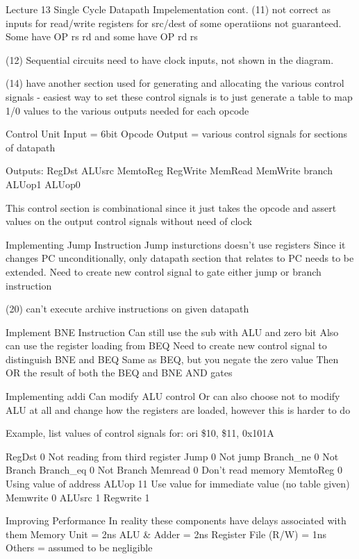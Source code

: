 \documentclass{article}
\begin{document}
Lecture 13
	Single Cycle Datapath Impelementation cont.
		(11) not correct as inputs for read/write registers for src/dest of some operatiions not guaranteed. Some have OP rs rd and some have OP rd rs

		(12) Sequential circuits need to have clock inputs, not shown in the diagram.

		(14) have another section used for generating and allocating the various control signals
		- easiest way to set these control signals is to just generate a table to map 1/0 values to the various outputs needed for each opcode

		Control Unit
			Input = 6bit Opcode
			Output = various control signals for sections of datapath

			Outputs:
				RegDst
				ALUsrc
				MemtoReg
				RegWrite
				MemRead
				MemWrite
				branch
				ALUop1
				ALUop0

			This control section is combinational since it just takes the opcode and assert values on the output control signals without need of clock

		Implementing Jump Instruction
			Jump insturctions doesn't use registers
			Since it changes PC unconditionally, only datapath section that relates to PC needs to be extended. 
			Need to create new control signal to gate either jump or branch instruction

		(20) can't execute archive instructions on given datapath 

		Implement BNE Instruction
			Can still use the sub with ALU and zero bit
			Also can use the register loading from BEQ
			Need to create new control signal to distinguish BNE and BEQ
				Same as BEQ, but you negate the zero value
			Then OR the result  of both the BEQ and BNE AND gates

		Implementing addi
			Can modify ALU control
			Or can also choose not to modify ALU at all and change how the registers are loaded, however this is harder to do


		Example, list values of control signals for:   
			ori \$10, \$11, 0x101A

			RegDst		0	Not reading from third register
			Jump		0	Not jump
			Branch\_ne	0	Not Branch
			Branch\_eq	0	Not Branch
			Memread		0	Don't read memory
			MemtoReg	0	Using value of address
			ALUop		11	Use value for immediate value (no table given)
			Memwrite	0
			ALUsrc		1
			Regwrite	1

	Improving Performance
		In reality these components have delays associated with them
		Memory Unit = 2ns
		ALU \& Adder = 2ns
		Register File (R/W) = 1ns
		Others = assumed to be negligible
\end{document}
